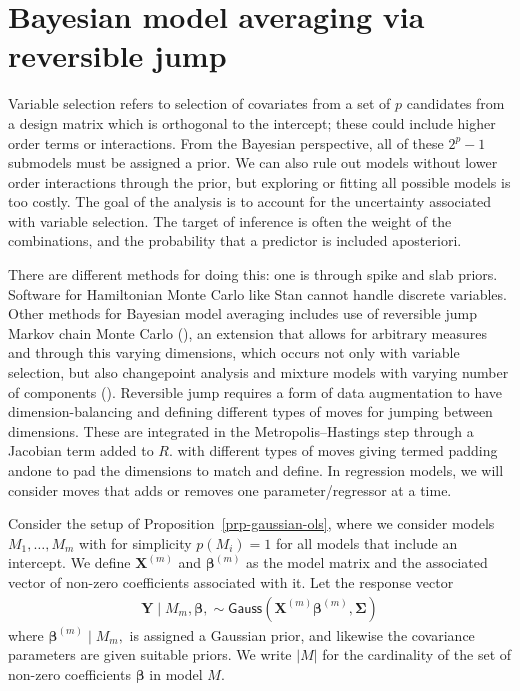 \documentclass[
  11pt,
  letterpaper,
]{scrbook}
\theoremstyle{definition}
\theoremstyle{definition}
\theoremstyle{definition}
\theoremstyle{plain}
\theoremstyle{plain}
\theoremstyle{plain}
\theoremstyle{remark}
\begin{document}
\section{Bayesian model averaging via reversible
jump}\label{bayesian-model-averaging-via-reversible-jump}

Variable selection refers to selection of covariates from a set of \(p\)
candidates from a design matrix which is orthogonal to the intercept;
these could include higher order terms or interactions. From the
Bayesian perspective, all of these \(2^p-1\) submodels must be assigned
a prior. We can also rule out models without lower order interactions
through the prior, but exploring or fitting all possible models is too
costly. The goal of the analysis is to account for the uncertainty
associated with variable selection. The target of inference is often the
weight of the combinations, and the probability that a predictor is
included aposteriori.

There are different methods for doing this: one is through spike and
slab priors. Software for Hamiltonian Monte Carlo like Stan cannot
handle discrete variables. Other methods for Bayesian model averaging
includes use of reversible jump Markov chain Monte Carlo
(), an extension that allows for
arbitrary measures and through this varying dimensions, which occurs not
only with variable selection, but also changepoint analysis and mixture
models with varying number of components
(). Reversible jump requires a form
of data augmentation to have dimension-balancing and defining different
types of moves for jumping between dimensions. These are integrated in
the Metropolis--Hastings step through a Jacobian term added to \(R\).
with different types of moves giving termed padding andone to pad the
dimensions to match and define. In regression models, we will consider
moves that adds or removes one parameter/regressor at a time.

Consider the setup of Proposition~\ref{prp-gaussian-ols}, where we
consider models \(M_1, \ldots, M_m\) with for simplicity \(p(M_i)=1\)
for all models that include an intercept. We define \(\mathbf{X}^{(m)}\)
and \(\boldsymbol{\beta}^{(m)}\) as the model matrix and the associated
vector of non-zero coefficients associated with it. Let the response
vector \begin{align*}
\boldsymbol{Y} \mid M_m, \boldsymbol{\beta}, \sim \mathsf{Gauss}(\mathbf{X}^{(m)}\boldsymbol{\beta}^{(m)}, \boldsymbol{\Sigma})    
\end{align*} where \(\boldsymbol{\beta}^{(m)} \mid M_m,\) is assigned a
Gaussian prior, and likewise the covariance parameters are given
suitable priors. We write \(|M|\) for the cardinality of the set of
non-zero coefficients \(\boldsymbol{\beta}\) in model \(M.\)
\end{document}
